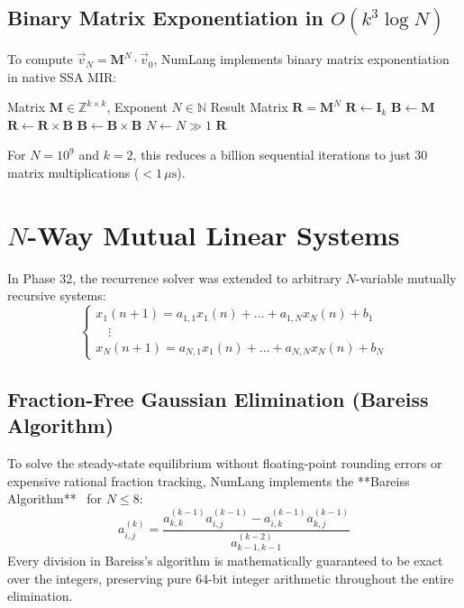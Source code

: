 \subsection{Binary Matrix Exponentiation in $O(k^3 \log N)$}
To compute $\vec{v}_N = \mathbf{M}^N \cdot \vec{v}_0$, NumLang implements binary matrix exponentiation in native SSA MIR:
\begin{algorithm}[htbp]
\caption{Binary Exponentiation over Matrix Monoid}
\label{alg:mat_pow}
\begin{algorithmic}[1]
\Require Matrix $\mathbf{M} \in \mathbb{Z}^{k \times k}$, Exponent $N \in \mathbb{N}$
\Ensure Result Matrix $\mathbf{R} = \mathbf{M}^N$
    \State $\mathbf{R} \gets \mathbf{I}_k$ 
    \State $\mathbf{B} \gets \mathbf{M}$
            \State $\mathbf{R} \gets \mathbf{R} \times \mathbf{B}$
        \EndIf
        \State $\mathbf{B} \gets \mathbf{B} \times \mathbf{B}$
        \State $N \gets N \gg 1$
    \EndWhile
    \State \Return $\mathbf{R}$
\EndProcedure
\end{algorithmic}
\end{algorithm}

For $N = 10^9$ and $k = 2$, this reduces a billion sequential iterations to just 30 matrix multiplications ($< 1\,\mu\text{s}$).

\section{$N$-Way Mutual Linear Systems}
\label{sec:rec:nway}

In Phase 32, the recurrence solver was extended to arbitrary $N$-variable mutually recursive systems:
\begin{equation}
\begin{cases}
x_1(n+1) = a_{1,1} x_1(n) + \dots + a_{1,N} x_N(n) + b_1 \\
\quad \vdots \\
x_N(n+1) = a_{N,1} x_1(n) + \dots + a_{N,N} x_N(n) + b_N
\end{cases}
\end{equation}

\subsection{Fraction-Free Gaussian Elimination (Bareiss Algorithm)}
To solve the steady-state equilibrium without floating-point rounding errors or expensive rational fraction tracking, NumLang implements the **Bareiss Algorithm**~\cite{bareiss1968sylvester} for $N \le 8$:
\begin{equation}
a_{i,j}^{(k)} = \frac{a_{k,k}^{(k-1)} a_{i,j}^{(k-1)} - a_{i,k}^{(k-1)} a_{k,j}^{(k-1)}}{a_{k-1,k-1}^{(k-2)}}
\end{equation}
Every division in Bareiss's algorithm is mathematically guaranteed to be exact over the integers, preserving pure 64-bit integer arithmetic throughout the entire elimination.

